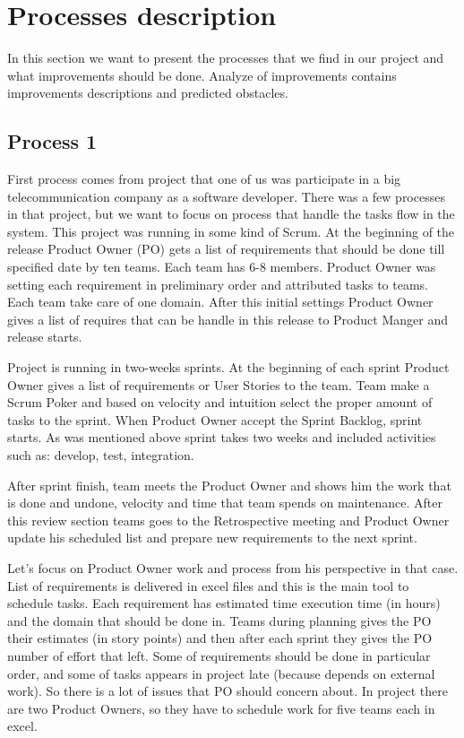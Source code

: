 \section{Processes description}

In this section we want to present the processes that we find in our project and what improvements should be done. Analyze of improvements contains improvements descriptions and predicted obstacles.

\subsection*{Process 1}

First process comes from project that one of us was participate in a big telecommunication company as a software developer. There was a few processes in that project, but we want to focus on process that handle the tasks flow in the system. This project was running in some kind of Scrum. At the beginning of the release Product Owner (PO) gets a list of requirements that should be done till specified date by ten teams. Each team has 6-8 members. Product Owner was setting each requirement in preliminary order and attributed tasks to teams. Each team take care of one domain. After this initial settings Product Owner gives a list of requires that can be handle in this release to Product Manger and release starts.

Project is running in two-weeks sprints. At the beginning of each sprint Product Owner gives a list of requirements or User Stories to the team. Team make a Scrum Poker and based on velocity and intuition select the proper amount of tasks to the sprint. When Product Owner accept the Sprint Backlog, sprint starts. As was mentioned above sprint takes two weeks and included activities such as: develop, test, integration. 

After sprint finish, team meets the Product Owner and shows him the work that is done and undone, velocity and time that team spends on maintenance. After this review section teams goes to the Retrospective meeting and Product Owner update his scheduled list and prepare new requirements to the next sprint.

Let's focus on Product Owner work and process from his perspective in that case. List of requirements is delivered in excel files and this is the main tool to schedule tasks. Each requirement has estimated time execution time (in hours) and the domain that should be done in. Teams during planning gives the PO their estimates (in story points) and then after each sprint they gives the PO number of effort that left.  Some of requirements should be done in particular order, and some of tasks appears in project late (because depends on external work). So there is a lot of issues that PO should concern about. In project there are two Product Owners, so they have to schedule work for five teams each in excel.

